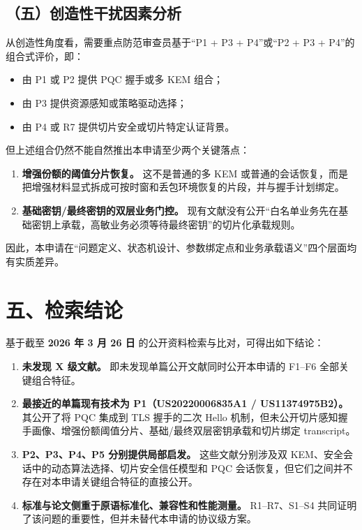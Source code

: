 \documentclass[12pt,a4paper]{article}
\begin{document}
\subsection*{（五）创造性干扰因素分析}

从创造性角度看，需要重点防范审查员基于“P1 + P3 + P4”或“P2 + P3 + P4”的组合式评价，即：

\begin{itemize}[leftmargin=2em]
    \item 由 P1 或 P2 提供 PQC 握手或多 KEM 组合；
    \item 由 P3 提供资源感知或策略驱动选择；
    \item 由 P4 或 R7 提供切片安全或切片特定认证背景。
\end{itemize}

但上述组合仍然不能自然推出本申请至少两个关键落点：

\begin{enumerate}[leftmargin=2em]
    \item \textbf{增强份额的阈值分片恢复。} 这不是普通的多 KEM 或普通的会话恢复，而是把增强材料显式拆成可按时窗和丢包环境恢复的片段，并与握手计划绑定。
    \item \textbf{基础密钥/最终密钥的双层业务门控。} 现有文献没有公开“白名单业务先在基础密钥上承载，高敏业务必须等待最终密钥”的切片化承载规则。
\end{enumerate}

因此，本申请在“问题定义、状态机设计、参数绑定点和业务承载语义”四个层面均有实质差异。

\section*{五、检索结论}

基于截至 \textbf{2026 年 3 月 26 日} 的公开资料检索与比对，可得出如下结论：

\begin{enumerate}[leftmargin=2em]
    \item \textbf{未发现 X 级文献。} 即未发现单篇公开文献同时公开本申请的 F1--F6 全部关键组合特征。
    \item \textbf{最接近的单篇现有技术为 P1（US20220006835A1 / US11374975B2）。} 其公开了将 PQC 集成到 TLS 握手的二次 Hello 机制，但未公开切片感知握手画像、增强份额阈值分片、基础/最终双层密钥承载和切片绑定 transcript。
    \item \textbf{P2、P3、P4、P5 分别提供局部启发。} 这些文献分别涉及双 KEM、安全会话中的动态算法选择、切片安全信任模型和 PQC 会话恢复，但它们之间并不存在对本申请关键组合特征的直接公开。
    \item \textbf{标准与论文侧重于原语标准化、兼容性和性能测量。} R1--R7、S1--S4 共同证明了该问题的重要性，但并未替代本申请的协议级方案。
\end{enumerate}
\end{document}
